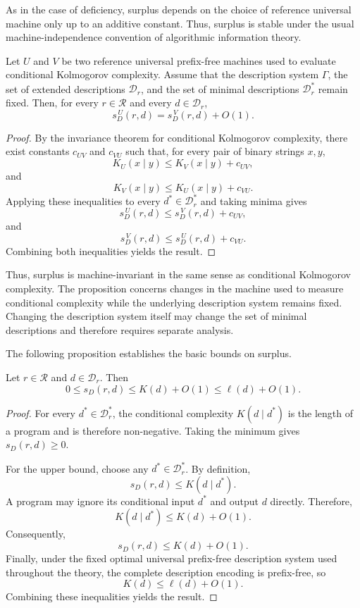 As in the case of deficiency, surplus depends on the choice of reference universal machine only up to an additive constant. Thus, surplus is stable under the usual machine-independence convention of algorithmic information theory.

\begin{proposition}
\label{prop:surplus_description_machine_invariance}
Let $U$ and $V$ be two reference universal prefix-free machines used to evaluate conditional Kolmogorov complexity. Assume that the description system $\Gamma$, the set of extended descriptions $\mathcal D_r$, and the set of minimal descriptions $\mathcal D_r^\ast$ remain fixed. Then, for every $r\in\mathcal R$ and every $d\in\mathcal D_r$,
\[
s_D^{\,U}(r,d) = s_D^{\,V}(r,d) + O(1).
\]
\end{proposition}
\begin{proof}
By the invariance theorem for conditional Kolmogorov complexity, there exist constants $c_{UV}$ and $c_{VU}$ such that, for every pair of binary strings $x,y$,
\[
K_U(x\mid y)\le K_V(x\mid y)+c_{UV},
\]
and
\[
K_V(x\mid y)\le K_U(x\mid y)+c_{VU}.
\]
Applying these inequalities to every $d^\ast\in\mathcal D_r^\ast$ and taking minima gives
\[
s_D^{\,U}(r,d)\le s_D^{\,V}(r,d)+c_{UV},
\]
and
\[
s_D^{\,V}(r,d)\le s_D^{\,U}(r,d)+c_{VU}.
\]
Combining both inequalities yields the result.
\end{proof}

Thus, surplus is machine-invariant in the same sense as conditional Kolmogorov complexity. The proposition concerns changes in the machine used to measure conditional complexity while the underlying description system remains fixed. Changing the description system itself may change the set of minimal descriptions and therefore requires separate analysis.

The following proposition establishes the basic bounds on surplus.

\begin{proposition}
\label{prop:surplus_description_upper_bound}
Let $r\in\mathcal R$ and $d\in\mathcal D_r$. Then
\[
0\le s_D(r,d)\le K(d)+O(1)\le\ell(d)+O(1).
\]
\end{proposition}
\begin{proof}
For every $d^\ast\in\mathcal D_r^\ast$, the conditional complexity $K(d\mid d^\ast)$ is the length of a program and is therefore non-negative. Taking the minimum gives $s_D(r,d) \ge 0$.

For the upper bound, choose any $d^\ast\in\mathcal D_r^\ast$. By definition,
\[
s_D(r,d)\le K(d\mid d^\ast).
\]
A program may ignore its conditional input $d^\ast$ and output $d$ directly. Therefore,
\[
K(d\mid d^\ast)\le K(d)+O(1).
\]
Consequently,
\[
s_D(r,d)\le K(d)+O(1).
\]
Finally, under the fixed optimal universal prefix-free description system used throughout the theory, the complete description encoding is prefix-free, so
\[
K(d)\le\ell(d)+O(1).
\]
Combining these inequalities yields the result.
\end{proof}

